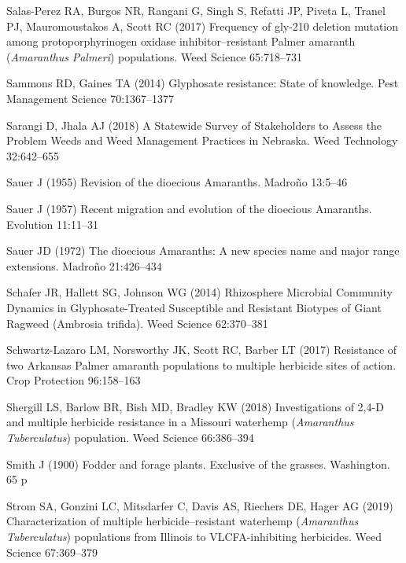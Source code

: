 \documentclass[
  12pt,
  a4paper]{article}
\begin{document}
\leavevmode\hypertarget{ref-salas-perez_frequency_2017}{}%
Salas-Perez RA, Burgos NR, Rangani G, Singh S, Refatti JP, Piveta L,
Tranel PJ, Mauromoustakos A, Scott RC (2017) Frequency of gly-210
deletion mutation among protoporphyrinogen oxidase inhibitor--resistant
Palmer amaranth (\emph{Amaranthus} \emph{Palmeri}) populations. Weed
Science 65:718--731

\leavevmode\hypertarget{ref-sammons_glyphosate_2014}{}%
Sammons RD, Gaines TA (2014) Glyphosate resistance: State of knowledge.
Pest Management Science 70:1367--1377

\leavevmode\hypertarget{ref-sarangi_statewide_2018-1}{}%
Sarangi D, Jhala AJ (2018) A Statewide Survey of Stakeholders to Assess
the Problem Weeds and Weed Management Practices in Nebraska. Weed
Technology 32:642--655

\leavevmode\hypertarget{ref-sauer_revision_1955}{}%
Sauer J (1955) Revision of the dioecious Amaranths. Madroño 13:5--46

\leavevmode\hypertarget{ref-sauer_recent_1957}{}%
Sauer J (1957) Recent migration and evolution of the dioecious
Amaranths. Evolution 11:11--31

\leavevmode\hypertarget{ref-sauer_dioecious_1972}{}%
Sauer JD (1972) The dioecious Amaranths: A new species name and major
range extensions. Madroño 21:426--434

\leavevmode\hypertarget{ref-schafer_rhizosphere_2014}{}%
Schafer JR, Hallett SG, Johnson WG (2014) Rhizosphere Microbial
Community Dynamics in Glyphosate-Treated Susceptible and Resistant
Biotypes of Giant Ragweed (Ambrosia trifida). Weed Science 62:370--381

\leavevmode\hypertarget{ref-schwartz-lazaro_resistance_2017}{}%
Schwartz-Lazaro LM, Norsworthy JK, Scott RC, Barber LT (2017) Resistance
of two Arkansas Palmer amaranth populations to multiple herbicide sites
of action. Crop Protection 96:158--163

\leavevmode\hypertarget{ref-shergill_investigations_2018}{}%
Shergill LS, Barlow BR, Bish MD, Bradley KW (2018) Investigations of
2,4-D and multiple herbicide resistance in a Missouri waterhemp
(\emph{Amaranthus} \emph{Tuberculatus}) population. Weed Science
66:386--394

\leavevmode\hypertarget{ref-smith_fodder_1900}{}%
Smith J (1900) Fodder and forage plants. Exclusive of the grasses.
Washington. 65 p

\leavevmode\hypertarget{ref-strom_characterization_2019}{}%
Strom SA, Gonzini LC, Mitsdarfer C, Davis AS, Riechers DE, Hager AG
(2019) Characterization of multiple herbicide--resistant waterhemp
(\emph{Amaranthus} \emph{Tuberculatus}) populations from Illinois to
VLCFA-inhibiting herbicides. Weed Science 67:369--379
\end{document}
